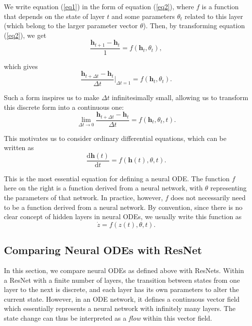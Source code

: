 \documentclass[a4paper,11pt,titlepage]{article}
\theoremstyle{definition}
\theoremstyle{plain}
\theoremstyle{remark}
\begin{document}
We write equation (\ref{eq1}) in the form of equation (\ref{eq2}), where $f$ is a function that depends on the state of layer $t$ and some parameters $\theta_t$ related to this layer (which belong to the larger parameter vector $\theta$). Then, by transforming equation (\ref{eq2}), we get
$$\frac{\textbf{h}_{t+1} - \textbf{h}_t}{1}=f\left(\textbf{h}_t, \theta_t\right),$$

which gives
$$\frac{\textbf{h}_{t+\Delta t} - \textbf{h}_t }{\Delta t}\Bigg\rvert_{\Delta t=1}=f\left(\textbf{h}_t, \theta_t\right).$$

Such a form inspires us to make $\Delta t$ infinitesimally small, allowing us to transform this discrete form into a continuous one:
$$\lim_{\Delta t\to 0}\frac{\textbf{h}_{t+\Delta t} - \textbf{h}_t }{\Delta t}= f(\textbf{h}_t, \theta_t,t).$$

This motivates us to consider ordinary differential equations, which can be written as
$$\frac{\mathrm{d}{\textbf{h}}(t)}{\mathrm{d}t}=f(\textbf{h}(t),\theta,t).$$

This is the most essential equation for defining a neural ODE. The function $f$ here on the right is a function derived from a neural network, with $\theta$ representing the parameters of that network. In practice, however, $f$ does not necessarily need to be a function derived from a neural network. By convention, since there is no clear concept of hidden layers in neural ODEs, we usually write this function as
\begin{equation}
    \dot{z}=f(z(t),\theta,t).
    \label{nodeeqn}
\end{equation}

\subsection{Comparing Neural ODEs with ResNet}

In this section, we compare neural ODEs as defined above with ResNets. Within a ResNet with a finite number of layers, the transition between states from one layer to the next is discrete, and each layer has its own parameters to alter the current state. However, in an ODE network, it defines a continuous vector field which essentially represents a neural network with infinitely many layers. The state change can thus be interpreted as a \textit{flow} within this vector field.
\end{document}
